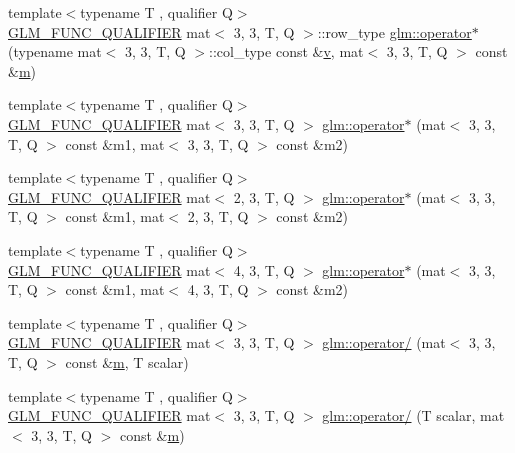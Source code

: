 \begin{DoxyCompactItemize}
\item 
{\footnotesize template$<$typename T , qualifier Q$>$ }\\\mbox{\hyperlink{setup_8hpp_a33fdea6f91c5f834105f7415e2a64407}{G\+L\+M\+\_\+\+F\+U\+N\+C\+\_\+\+Q\+U\+A\+L\+I\+F\+I\+ER}} mat$<$ 3, 3, T, Q $>$\+::row\+\_\+type \mbox{\hyperlink{namespaceglm_a4c4ed3ab1c20ac7cf1622296aa51e82f}{glm\+::operator$\ast$}} (typename mat$<$ 3, 3, T, Q $>$\+::col\+\_\+type const \&\mbox{\hyperlink{_s_d_l__opengl_8h_a10a82eabcb59d2fcd74acee063775f90}{v}}, mat$<$ 3, 3, T, Q $>$ const \&\mbox{\hyperlink{_s_d_l__opengl__glext_8h_af593500c283bf1a787a6f947f503a5c2}{m}})
\item 
{\footnotesize template$<$typename T , qualifier Q$>$ }\\\mbox{\hyperlink{setup_8hpp_a33fdea6f91c5f834105f7415e2a64407}{G\+L\+M\+\_\+\+F\+U\+N\+C\+\_\+\+Q\+U\+A\+L\+I\+F\+I\+ER}} mat$<$ 3, 3, T, Q $>$ \mbox{\hyperlink{namespaceglm_ade5fcf5adafcd8d57c6a021c3711b713}{glm\+::operator$\ast$}} (mat$<$ 3, 3, T, Q $>$ const \&m1, mat$<$ 3, 3, T, Q $>$ const \&m2)
\item 
{\footnotesize template$<$typename T , qualifier Q$>$ }\\\mbox{\hyperlink{setup_8hpp_a33fdea6f91c5f834105f7415e2a64407}{G\+L\+M\+\_\+\+F\+U\+N\+C\+\_\+\+Q\+U\+A\+L\+I\+F\+I\+ER}} mat$<$ 2, 3, T, Q $>$ \mbox{\hyperlink{namespaceglm_a3ed3940c34380e4dc5ed3a717d09cd19}{glm\+::operator$\ast$}} (mat$<$ 3, 3, T, Q $>$ const \&m1, mat$<$ 2, 3, T, Q $>$ const \&m2)
\item 
{\footnotesize template$<$typename T , qualifier Q$>$ }\\\mbox{\hyperlink{setup_8hpp_a33fdea6f91c5f834105f7415e2a64407}{G\+L\+M\+\_\+\+F\+U\+N\+C\+\_\+\+Q\+U\+A\+L\+I\+F\+I\+ER}} mat$<$ 4, 3, T, Q $>$ \mbox{\hyperlink{namespaceglm_a994c9e059f37468648c2390d90b8c4dd}{glm\+::operator$\ast$}} (mat$<$ 3, 3, T, Q $>$ const \&m1, mat$<$ 4, 3, T, Q $>$ const \&m2)
\item 
{\footnotesize template$<$typename T , qualifier Q$>$ }\\\mbox{\hyperlink{setup_8hpp_a33fdea6f91c5f834105f7415e2a64407}{G\+L\+M\+\_\+\+F\+U\+N\+C\+\_\+\+Q\+U\+A\+L\+I\+F\+I\+ER}} mat$<$ 3, 3, T, Q $>$ \mbox{\hyperlink{namespaceglm_ad2ca24e662cda5ea986dab9d8c222a7b}{glm\+::operator/}} (mat$<$ 3, 3, T, Q $>$ const \&\mbox{\hyperlink{_s_d_l__opengl__glext_8h_af593500c283bf1a787a6f947f503a5c2}{m}}, T scalar)
\item 
{\footnotesize template$<$typename T , qualifier Q$>$ }\\\mbox{\hyperlink{setup_8hpp_a33fdea6f91c5f834105f7415e2a64407}{G\+L\+M\+\_\+\+F\+U\+N\+C\+\_\+\+Q\+U\+A\+L\+I\+F\+I\+ER}} mat$<$ 3, 3, T, Q $>$ \mbox{\hyperlink{namespaceglm_aeed0637179d40994ce5ae81fa151fcac}{glm\+::operator/}} (T scalar, mat$<$ 3, 3, T, Q $>$ const \&\mbox{\hyperlink{_s_d_l__opengl__glext_8h_af593500c283bf1a787a6f947f503a5c2}{m}})

\end{DoxyCompactItemize}
